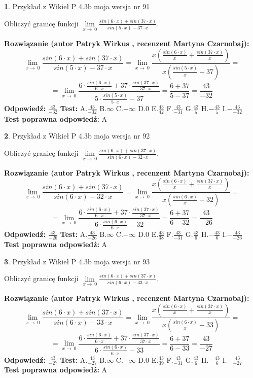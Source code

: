 \documentclass[12pt, a4paper]{article}
\theoremstyle{definition} %
\newtheorem{zad}{}
\newcommand{\zadStart}[1]{\begin{zad}#1\newline}
\newcommand{\zadStop}{\end{zad}}
\newcommand{\rozwStart}[2]{\noindent \textbf{Rozwiązanie (autor #1 , recenzent #2): }\newline}
\newcommand{\rozwStop}{\newline}
\newcommand{\odpStart}{\noindent \textbf{Odpowiedź:}\newline}
\newcommand{\odpStop}{\newline}
\newcommand{\testStart}{\noindent \textbf{Test:}\newline}
\newcommand{\testStop}{\newline}
\newcommand{\kluczStart}{\noindent \textbf{Test poprawna odpowiedź:}\newline}
\newcommand{\kluczStop}{\newline}
\begin{document}
\zadStart{Przykład z Wikieł P 4.3b moja wersja nr 91}


Obliczyć granicę funkcji $\lim\limits_{x\to\ 0}\frac{sin(6 \cdot x)+sin(37 \cdot x)}{sin(5 \cdot x)-37 \cdot x}$.
\zadStop
\rozwStart{Patryk Wirkus}{Martyna Czarnobaj}
$$\lim\limits_{x\to\ 0}\frac{sin(6 \cdot x)+sin(37 \cdot x)}{sin(5 \cdot x)-37 \cdot x}=\lim\limits_{x\to\ 0}\frac{x(\frac{sin(6 \cdot x)}{x}+\frac{sin(37 \cdot x)}{x})}{x(\frac{sin(5 \cdot x)}{x}-37)}=$$
$$=\lim\limits_{x\to\ 0}\frac{6 \cdot \frac{sin(6 \cdot x)}{6 \cdot x}+37 \cdot \frac{sin(37 \cdot x)}{37 \cdot x}}{5 \cdot \frac{sin(5 \cdot x)}{5 \cdot x}-37}=\frac{6+37}{5-37} = \frac{43}{-32}$$
\rozwStop
\odpStart
$\frac{43}{-32}$
\odpStop
\testStart
A.$\frac{43}{-32}$
B.$\infty$
C.$-\infty$
D.$0$
E.$\frac{43}{42}$
F.$\frac{43}{-31}$
G.$\frac{43}{5}$
H.$-\frac{43}{5}$
I.$-\frac{43}{-32}$
\testStop
\kluczStart
A
\kluczStop



\zadStart{Przykład z Wikieł P 4.3b moja wersja nr 92}


Obliczyć granicę funkcji $\lim\limits_{x\to\ 0}\frac{sin(6 \cdot x)+sin(37 \cdot x)}{sin(6 \cdot x)-32 \cdot x}$.
\zadStop
\rozwStart{Patryk Wirkus}{Martyna Czarnobaj}
$$\lim\limits_{x\to\ 0}\frac{sin(6 \cdot x)+sin(37 \cdot x)}{sin(6 \cdot x)-32 \cdot x}=\lim\limits_{x\to\ 0}\frac{x(\frac{sin(6 \cdot x)}{x}+\frac{sin(37 \cdot x)}{x})}{x(\frac{sin(6 \cdot x)}{x}-32)}=$$
$$=\lim\limits_{x\to\ 0}\frac{6 \cdot \frac{sin(6 \cdot x)}{6 \cdot x}+37 \cdot \frac{sin(37 \cdot x)}{37 \cdot x}}{6 \cdot \frac{sin(6 \cdot x)}{6 \cdot x}-32}=\frac{6+37}{6-32} = \frac{43}{-26}$$
\rozwStop
\odpStart
$\frac{43}{-26}$
\odpStop
\testStart
A.$\frac{43}{-26}$
B.$\infty$
C.$-\infty$
D.$0$
E.$\frac{43}{38}$
F.$\frac{43}{-31}$
G.$\frac{43}{6}$
H.$-\frac{43}{6}$
I.$-\frac{43}{-26}$
\testStop
\kluczStart
A
\kluczStop



\zadStart{Przykład z Wikieł P 4.3b moja wersja nr 93}


Obliczyć granicę funkcji $\lim\limits_{x\to\ 0}\frac{sin(6 \cdot x)+sin(37 \cdot x)}{sin(6 \cdot x)-33 \cdot x}$.
\zadStop
\rozwStart{Patryk Wirkus}{Martyna Czarnobaj}
$$\lim\limits_{x\to\ 0}\frac{sin(6 \cdot x)+sin(37 \cdot x)}{sin(6 \cdot x)-33 \cdot x}=\lim\limits_{x\to\ 0}\frac{x(\frac{sin(6 \cdot x)}{x}+\frac{sin(37 \cdot x)}{x})}{x(\frac{sin(6 \cdot x)}{x}-33)}=$$
$$=\lim\limits_{x\to\ 0}\frac{6 \cdot \frac{sin(6 \cdot x)}{6 \cdot x}+37 \cdot \frac{sin(37 \cdot x)}{37 \cdot x}}{6 \cdot \frac{sin(6 \cdot x)}{6 \cdot x}-33}=\frac{6+37}{6-33} = \frac{43}{-27}$$
\rozwStop
\odpStart
$\frac{43}{-27}$
\odpStop
\testStart
A.$\frac{43}{-27}$
B.$\infty$
C.$-\infty$
D.$0$
E.$\frac{43}{39}$
F.$\frac{43}{-31}$
G.$\frac{43}{6}$
H.$-\frac{43}{6}$
I.$-\frac{43}{-27}$
\testStop
\kluczStart
A
\kluczStop
\end{document}
